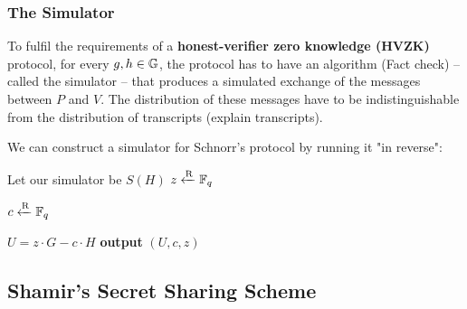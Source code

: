\subsubsection{The Simulator}
To fulfil the requirements of a \textbf{honest-verifier zero knowledge (HVZK)} protocol, for every $g, h \in \mathbb{G}$, the protocol has to have an algorithm (Fact check) -- called the simulator -- that produces a simulated exchange of the messages between $P$ and $V$. The distribution of these messages have to be indistinguishable from the distribution of transcripts (explain transcripts).

We can construct a simulator for Schnorr's protocol by running it "in reverse":

\begin{center}
    \begin{problem}[]{Let our simulator be $S(H)$}
    $z \xleftarrow{\text{\scriptsize R}} \mathbb{F}_q$
    
    $c \xleftarrow{\text{\scriptsize R}} \mathbb{F}_q$
    
    $U = z \cdot G - c \cdot H$
    \tcblower
    \textbf{output} $(U,c,z)$
    \end{problem}
\end{center}



\subsection{Shamir's Secret Sharing Scheme}

